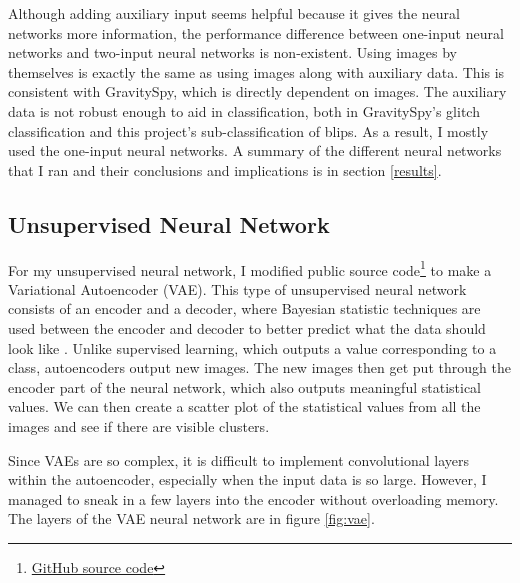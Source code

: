 \documentclass[a4paper]{article}
\begin{document}
Although adding auxiliary input seems helpful because it gives the neural networks more information, the performance difference between one-input neural networks and two-input neural networks is non-existent. Using images by themselves is exactly the same as using images along with auxiliary data. This is consistent with GravitySpy, which is directly dependent on images. The auxiliary data is not robust enough to aid in classification, both in GravitySpy's glitch classification and this project's sub-classification of blips. As a result, I mostly used the one-input neural networks. A summary of the different neural networks that I ran and their conclusions and implications is in section \ref{results}.

\subsection{Unsupervised Neural Network}

For my unsupervised neural network, I modified public source code\footnote{\href{https://github.com/keras-team/keras/blob/master/examples/variational_autoencoder.py}{GitHub source code}} to make a Variational Autoencoder (VAE). This type of unsupervised neural network consists of an encoder and a decoder, where Bayesian statistic techniques are used between the encoder and decoder to better predict what the data should look like . Unlike supervised learning, which outputs a value corresponding to a class, autoencoders output new images. The new images then get put through the encoder part of the neural network, which also outputs meaningful statistical values. We can then create a scatter plot of the statistical values from all the images and see if there are visible clusters\cite{Kingma:2013}. 

Since VAEs are so complex, it is difficult to implement convolutional layers within the autoencoder, especially when the input data is so large. However, I managed to sneak in a few layers into the encoder without overloading memory. The layers of the VAE neural network are in figure \ref{fig:vae}.
\end{document}

